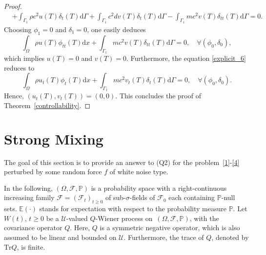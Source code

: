 \documentclass[10pt]{elsarticle}
\begin{document}
\begin{proof}
\begin{equation}
\begin{split}
&  + \int_{\Gamma_1}\rho c^2 u(T)\delta_t(T)\mathrm{d}\Gamma+ \int_{\Gamma_1}c^2 d v(T)\delta_t(T)\mathrm{d}\Gamma - \int_{\Gamma_1}m c^2 v(T)\delta_{tt}(T)\mathrm{d}\Gamma = 0.
\end{split}
\end{equation}
Choosing $\phi_1=0$ and $\delta_1=0$, one easily deduces 
\[
\int_{\Omega}\rho u(T)\phi_{tt}(T)\mathrm{d}x + \int_{\Gamma_1}m c^2 v(T)\delta_{tt}(T)\mathrm{d}\Gamma = 0, \quad \forall (\phi_0, \delta_0),
\]
which implies $u(T) = 0$ and $v(T) = 0$. Furthermore, the equation \eqref{explicit_6} reduces to
\[
\int_{\Omega}\rho u_{t}(T)\phi_t(T)\mathrm{d}x + \int_{\Gamma_1}m c^2 v_{t}(T)\delta_t(T)\mathrm{d}\Gamma = 0, \quad \forall (\phi_0, \delta_0).
\]
Hence, $(u_{t}(T), v_{t}(T))=(0, 0)$. This concludes the proof of Theorem~\ref{controllability}.
\end{proof}


\section{Strong Mixing}
\label{sec:mixing}

The goal of this section is to provide an answer to (Q2) for the problem~\eqref{1}-\eqref{4} perturbed by some random force $f$ of white noise type.


In the following, $(\Omega, \mathcal{F}, \mathbb{P})$ is a probability space with a right-continuous increasing family $\mathcal{F}=(\mathcal{F}_t)_{t\geqslant 0}$ of sub-$\sigma$-fields of $\mathcal{F}_0$ each containing $\mathbb{P}$-null sets. $\mathbb{E}(\cdot)$ stands for expectation with respect to the probability measure $\mathbb{P}$.  
Let $W(t)$, $t\geq 0$ be a $\mathcal{U}$-valued $Q$-Wiener process on~$(\Omega, \mathcal{F}, \mathbb{P})$, with the covariance operator $Q$. Here, $Q$ is a symmetric negative operator, which is also assumed to be linear and bounded on $\mathcal{U}$. Furthermore, the trace of $Q$, denoted by $\mathrm{Tr}Q$, is finite.
\end{document}
